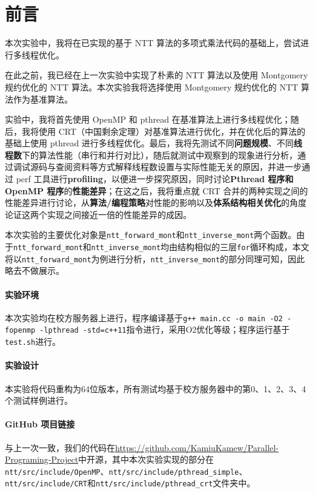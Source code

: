 \documentclass[a4paper]{article}
\begin{document}
\clearpage
\tableofcontents
\newpage

\section{前言}

本次实验中，我将在已实现的基于 NTT 算法的多项式乘法代码的基础上，尝试进行多线程优化。

在此之前，我已经在上一次实验中实现了朴素的 NTT 算法以及使用 Montgomery 规约优化的 NTT 算法。本次实验我将选择使用 Montgomery 规约优化的 NTT 算法作为基准算法。

实验中，我将首先使用 OpenMP 和 pthread 在基准算法上进行多线程优化；随后，我将使用 CRT（中国剩余定理）对基准算法进行优化，并在优化后的算法的基础上使用 pthread 进行多线程优化。最后，我将先测试不同\textbf{问题规模}、不同\textbf{线程数}下的算法性能（串行和并行对比），随后就测试中观察到的现象进行分析，通过调试源码与查阅资料等方式解释线程数设置与实际性能无关的原因，并进一步通过 perf 工具进行\textbf{profiling}，以便进一步探究原因，同时讨论\textbf{Pthread 程序和 OpenMP 程序}的\textbf{性能差异}；在这之后，我将重点就 CRT 合并的两种实现之间的性能差异进行讨论，从\textbf{算法/编程策略}对性能的影响以及\textbf{体系结构相关优化}的角度论证这两个实现之间接近一倍的性能差异的成因。

本次实验的主要优化对象是\texttt{ntt\_forward\_mont}和\texttt{ntt\_inverse\_mont}两个函数。由于\texttt{ntt\_forward\_mont}和\texttt{ntt\_inverse\_mont}均由结构相似的三层\texttt{for}循环构成，本文将以\texttt{ntt\_forward\_mont}为例进行分析，\texttt{ntt\_inverse\_mont}的部分同理可知，因此略去不做展示。

\paragraph{实验环境} 本次实验均在校方服务器上进行，程序编译基于\texttt{g++ main.cc -o main -O2 -fopenmp -lpthread -std=c++11}指令进行，采用O2优化等级；程序运行基于\texttt{test.sh}进行。

\paragraph{实验设计} 本实验将代码重构为64位版本，所有测试均基于校方服务器中的第0、1、2、3、4个测试样例进行。

\paragraph{GitHub 项目链接} 与上一次一致，我们的代码在\url{https://github.com/KamiuKamew/Parallel-Programing-Project}中开源，其中本次实验实现的部分在\texttt{ntt/src/include/OpenMP}、\texttt{ntt/src/include/pthread\_simple}、\texttt{ntt/src/include/CRT}和\texttt{ntt/src/include/pthread\_crt}文件夹中。
\end{document}
